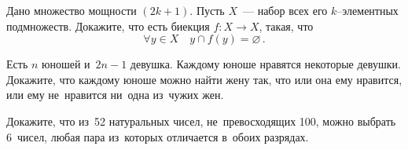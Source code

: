 \begin{problems}
\item
Дано множество мощности $(2 k + 1)$.
Пусть $X$~--- набор всех его $k$--элементных подмножеств.
Докажите, что есть биекция $f \colon X \to X$, такая, что
\[
    \forall y \in X
\quad
    y \cap f(y) = \varnothing
\,.\]

\item
Есть $n$ юношей и~$2 n - 1$ девушка.
Каждому юноше нравятся некоторые девушки.
Докажите, что каждому юноше можно найти жену так, что или она ему нравится, или
ему не~нравится ни~одна из~чужих жен.

\item
Докажите, что из~52 натуральных чисел, не~превосходящих 100, можно выбрать
6~чисел, любая пара из~которых отличается в~обоих разрядах.

\end{problems}

